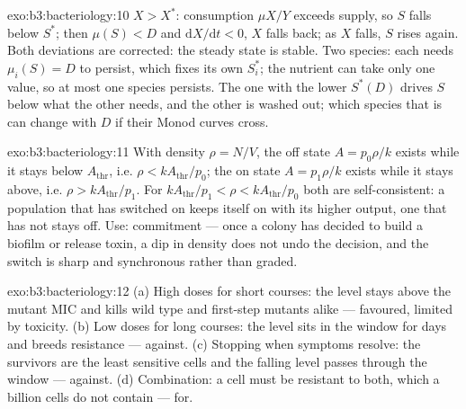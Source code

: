 \begin{solution}{exo:b3:bacteriology:10}
$X > X^{*}$: consumption $\mu X/Y$ exceeds supply, so $S$ falls below
$S^{*}$; then $\mu(S) < D$ and $\mathrm{d}X/\mathrm{d}t < 0$, $X$ falls
back; as $X$ falls, $S$ rises again. Both deviations are corrected: the
steady state is stable. Two species: each needs $\mu_{i}(S) = D$ to
persist, which fixes its own $S_{i}^{*}$; the nutrient can take only
one value, so at most one species persists. The one with the lower
$S^{*}(D)$ drives $S$ below what the other needs, and the other is
washed out; which species that is can change with $D$ if their Monod
curves cross.
\end{solution}

\begin{solution}{exo:b3:bacteriology:11}
With density $\rho = N/V$, the off state $A = p_{0}\rho/k$ exists while
it stays below $A_{\text{thr}}$, i.e. $\rho < kA_{\text{thr}}/p_{0}$;
the on state $A = p_{1}\rho/k$ exists while it stays above, i.e. $\rho
> kA_{\text{thr}}/p_{1}$. For $kA_{\text{thr}}/p_{1} < \rho <
kA_{\text{thr}}/p_{0}$ both are self-consistent: a population that has
switched on keeps itself on with its higher output, one that has not
stays off. Use: commitment --- once a colony has decided to build a
biofilm or release toxin, a dip in density does not undo the decision,
and the switch is sharp and synchronous rather than graded.
\end{solution}

\begin{solution}{exo:b3:bacteriology:12}
(a) High doses for short courses: the level stays above the mutant MIC
and kills wild type and first-step mutants alike --- favoured, limited
by toxicity. (b) Low doses for long courses: the level sits in the
window for days and breeds resistance --- against. (c) Stopping when
symptoms resolve: the survivors are the least sensitive cells and the
falling level passes through the window --- against. (d) Combination:
a cell must be resistant to both, which a billion cells do not contain
--- for.
\end{solution}

